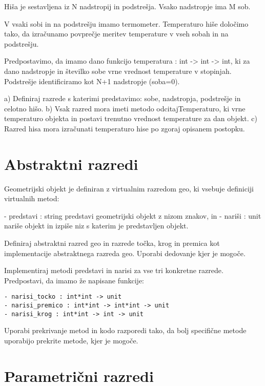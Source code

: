 \begin{ex}
Hi\v sa je sestavljena iz N nadstropij in podstre\v sja. Vsako nadstropje ima M sob.

V vsaki sobi in na podstre\v sju imamo termometer. Temperaturo hi\v se dolo\v cimo tako, da izra\v cunamo povpre\v cje meritev temperature v vseh sobah in na podstre\v sju. 

Predpostavimo, da imamo dano funkcijo temperatura : int -> int -> int, ki za dano nadstropje in \v stevilko sobe vrne vrednost temperature v stopinjah. Podstre\v sje identificiramo kot N+1 nadstropje (soba=0).

a) Definiraj razrede s katerimi predstavimo: sobe, nadstropja, podstre\v sje in celotno hi\v so.
b) Vsak razred mora imeti metodo odcitajTemperaturo, ki vrne temperaturo objekta in postavi trenutno vrednost temperature za dan objekt.
c) Razred hisa mora izra\v cunati temperaturo hise po zgoraj opisanem postopku.





\section{Abstraktni razredi}


\end{ex}
\begin{ex}
Geometrijski objekt je definiran z virtualnim razredom geo, ki vsebuje
definiciji virtualnih metod:

- predstavi : string
  predstavi geometrijski objekt z nizom znakov, in 
- nari\v si : unit 
  nari\v se objekt in izpi\v se niz s katerim je predstavljen objekt. 

Definiraj abstraktni razred geo in razrede to\v cka, krog in premica kot
implementacije abstraktnega razreda geo. Uporabi dedovanje kjer je mogo\v ce. 

Implementiraj metodi predstavi in narisi za vse tri konkretne razrede. 
Predpostavi, da imamo \v ze napisane funkcije: 
\begin{verbatim}
- narisi_tocko : int*int -> unit
- narisi_premico : int*int -> int*int -> unit
- narisi_krog : int*int -> int -> unit
\end{verbatim}

Uporabi prekrivanje metod in kodo razporedi tako, da bolj specifi\v cne metode uporabijo prekrite metode, kjer je mogo\v ce.





\section{Parametri\v cni razredi}


\end{ex}
